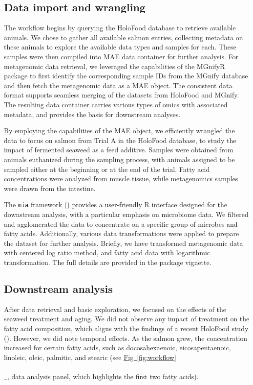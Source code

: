 \documentclass[unnumsec,webpdf,namedate,modern,large]{oup-authoring-template}%
\newcommand*{\figref}[2][]{%
  \hyperref[{fig:#2}]{%
    Fig~\ref*{fig:#2}%
    \ifx\\#1\\%
    \else
      \,#1%
    \fi
  }%
}
\begin{document}
\vspace{-1em}
\subsection{Data import and wrangling}

The workflow begins by querying the HoloFood database to retrieve available animals. We chose to gather all available salmon entries, collecting metadata on these animals to explore the available data types and samples for each. These samples were then compiled into MAE data container for further analysis. For metagenomic data retrieval, we leveraged the capabilities of the MGnifyR package to first identify the corresponding sample IDs from the MGnify database and then fetch the metagenomic data as a MAE object. The consistent data format supports  seamless merging of the datasets from HoloFood and MGnify. The resulting data container carries various types of omics with associated metadata, and provides the basis for downstream analyses.

By employing the capabilities of the MAE object, we efficiently wrangled the data to focus on salmon from Trial A in the HoloFood database, to study the impact of fermented seaweed as a feed additive. Samples were obtained from animals euthanized during the sampling process, with animals assigned to be sampled either at the beginning or at the end of the trial. Fatty acid concentrations were analyzed from muscle tissue, while metagenomics samples were drawn from the intestine.

The \texttt{mia} framework (\cite{mia, miaViz}) provides a user-friendly R interface designed for the downstream analysis, with a particular emphasis on microbiome data. We filtered and agglomerated the data to concentrate on a specific group of microbes and fatty acids. Additionally, various data transformations were applied to prepare the dataset for further analysis. Briefly, we have transformed metagenomic data with centered log ratio method, and fatty acid data with logarithmic transformation. The full details are provided in the package vignette.

\vspace{-1em}
\subsection{Downstream analysis}

After data retrieval and basic exploration, we focused on the effects of the seaweed treatment and aging. We did not observe any impact of treatment on the fatty acid composition, which aligns with the findings of a recent HoloFood study (\cite{rasmussen_holo-omics_2025}). However, we did note temporal effects. As the salmon grew, the concentration increased for certain fatty acids, such as docosahexaenoic, eicosapentaenoic, linoleic, oleic, palmitic, and stearic  (see \figref{workflow}, data analysis panel, which highlights the first two fatty acids).
\end{document}
